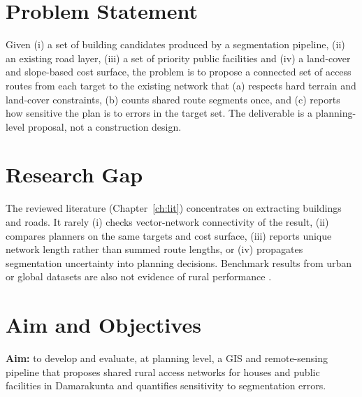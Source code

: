 \documentclass[12pt,a4paper]{report}
\begin{document}
\section{Problem Statement}
Given (i) a set of building candidates produced by a segmentation pipeline, (ii) an existing road layer, (iii) a set of priority public facilities and (iv) a land-cover and slope-based cost surface, the problem is to propose a connected set of access routes from each target to the existing network that (a) respects hard terrain and land-cover constraints, (b) counts shared route segments once, and (c) reports how sensitive the plan is to errors in the target set. The deliverable is a planning-level proposal, not a construction design.

\section{Research Gap}
The reviewed literature (Chapter~\ref{ch:lit}) concentrates on extracting buildings and roads. It rarely (i) checks vector-network connectivity of the result, (ii) compares planners on the same targets and cost surface, (iii) reports unique network length rather than summed route lengths, or (iv) propagates segmentation uncertainty into planning decisions. Benchmark results from urban or global datasets are also not evidence of rural performance \cite{L11,F05}.

\section{Aim and Objectives}
\textbf{Aim:} to develop and evaluate, at planning level, a GIS and remote-sensing pipeline that proposes shared rural access networks for houses and public facilities in Damarakunta and quantifies sensitivity to segmentation errors.
\end{document}
